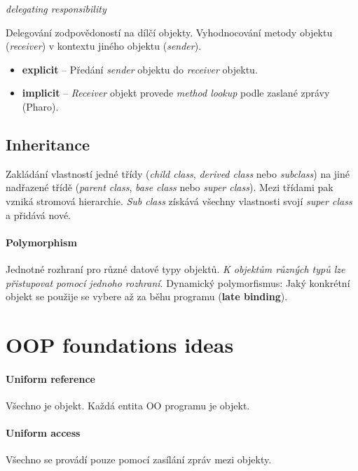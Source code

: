 \documentclass{szzclass}
\begin{document}
\textit{delegating responsibility}


Delegování zodpovědoností na dílčí objekty.
Vyhodnocování metody objektu (\textit{receiver}) v kontextu jiného objektu (\textit{sender}).

\begin{itemize}
      \item \textbf{explicit} -- Předání \textit{sender} objektu do \textit{receiver} objektu.
      \item \textbf{implicit} -- \textit{Receiver} objekt provede \textit{method lookup} podle zaslané zprávy (Pharo).
\end{itemize}

\subsection{Inheritance}

Zakládání vlastností jedné třídy (\textit{child class}, \textit{derived class} nebo \textit{subclass}) na
jiné nadřazené třídě (\textit{parent class}, \textit{base class} nebo \textit{super class}).
Mezi třídami pak vzniká stromová hierarchie. \textit{Sub class} získává všechny vlastnosti svojí
\textit{super class} a přidává nové.

\paragraph{Polymorphism}
Jednotné rozhraní pro různé datové typy objektů. \textit{K objektům různých typů lze přistupovat pomocí jednoho
rozhraní}.
Dynamický polymorfismus: Jaký konkrétní objekt se použije se vybere až za běhu programu (\textbf{late binding}).


\section{OOP foundations ideas}

\paragraph{Uniform reference}
Všechno je objekt. Každá entita OO programu je objekt.

\paragraph{Uniform access}
Všechno se provádí pouze pomocí zasílání zpráv mezi objekty.
\end{document}
